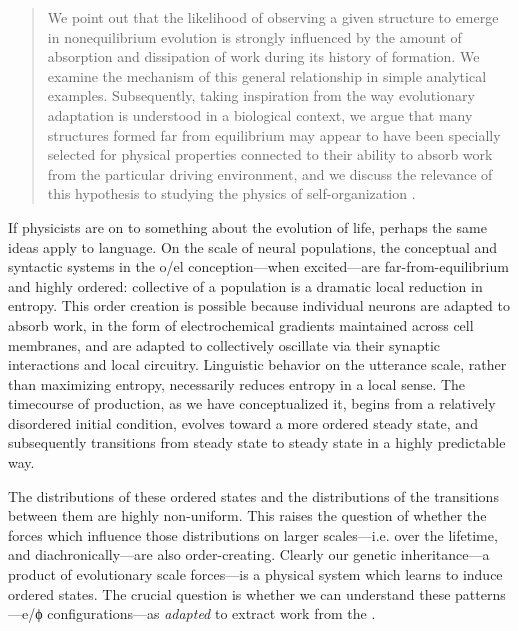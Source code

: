 \begin{quote}
We point out that the likelihood of observing a given structure to emerge in nonequilibrium evolution is strongly influenced by the amount of absorption and dissipation of work during its history of formation. We examine the mechanism of this general relationship in simple analytical examples. Subsequently, taking inspiration from the way evolutionary adaptation is understood in a biological context, we argue that many structures formed far from equilibrium may appear to have been specially selected for physical properties connected to their ability to absorb work from the particular driving environment, and we discuss the relevance of this hypothesis to studying the physics of self-organization \citep{PerunovEtAl2016}.
\end{quote}

  If physicists are on to something about the evolution of life, perhaps the same ideas apply to language. On the scale of neural populations, the conceptual and syntactic systems in the o/el conception—when excited—are far-from-equilibrium and highly ordered: collective  of a population is a dramatic local reduction in entropy. This order creation is possible because individual neurons are adapted to absorb work, in the form of electrochemical gradients maintained across cell membranes, and are adapted to collectively oscillate via their synaptic interactions and local circuitry. Linguistic behavior on the utterance scale, rather than maximizing entropy, necessarily reduces entropy in a local sense. The timecourse of production, as we have conceptualized it, begins from a relatively disordered initial condition, evolves toward a more ordered steady state, and subsequently transitions from steady state to steady state in a highly predictable way. 

  The distributions of these ordered states and the distributions of the transitions between them are highly non-uniform. This raises the question of whether the forces which influence those distributions on larger scales—i.e. over the lifetime, and diachronically—are also order-creating. Clearly our genetic inheritance—a product of evolutionary scale forces—is a physical system which learns to induce ordered states. The crucial question is whether we can understand these patterns—e/ϕ configurations—as \textit{adapted} to extract work from the .

